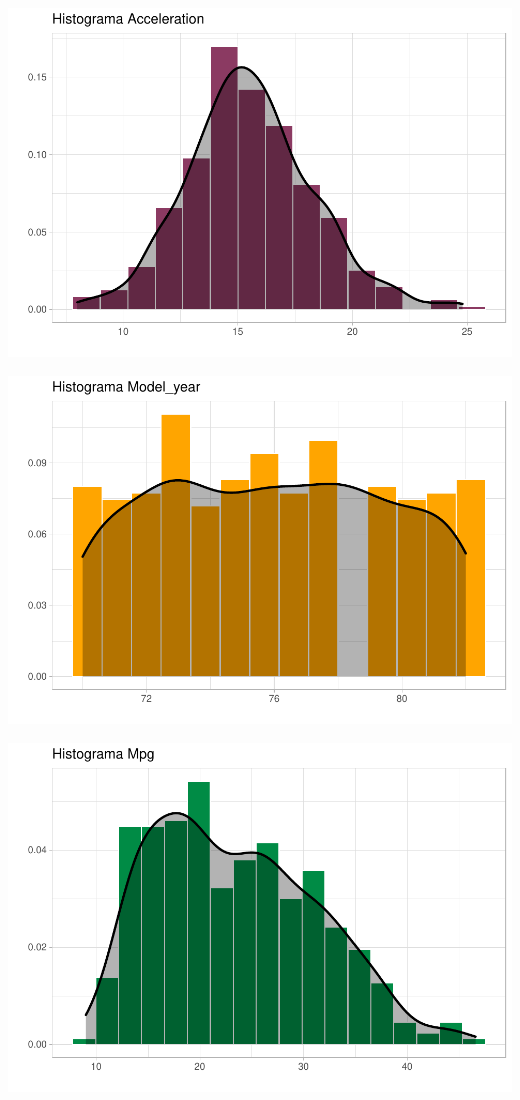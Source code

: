 \begin{center}\includegraphics{img/EDA_files/figure-latex/unnamed-chunk-7-4} \end{center}
\begin{center}\includegraphics{img/EDA_files/figure-latex/unnamed-chunk-7-5} \end{center}
\begin{center}\includegraphics{img/EDA_files/figure-latex/unnamed-chunk-7-6} \end{center}


